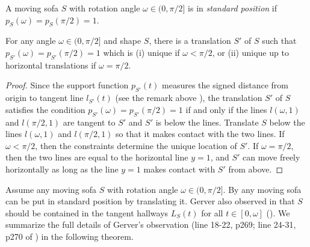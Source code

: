 \begin{definition}

A moving sofa \(S\) with rotation angle \(\omega \in (0, \pi/2]\) is in \emph{standard position} if \(p_S(\omega) = p_S(\pi/2) = 1\).

\label{def:standard-position}
\end{definition}

\begin{proposition}

For any angle \(\omega \in (0, \pi/2]\) and shape \(S\), there is a translation \(S'\) of \(S\) such that \(p_{S'}(\omega) = p_{S'}(\pi/2) = 1\) which is (i) unique if \(\omega < \pi/2\), or (ii) unique up to horizontal translations if \(\omega = \pi/2\).

\label{pro:standard-position-shape}
\end{proposition}

\begin{proof}
Since the support function \(p_{S'}(t)\) measures the signed distance from origin to tangent line \(l_{S'}(t)\) (see the remark above ), the translation \(S'\) of \(S\) satisfies the condition \(p_{S'}(\omega) = p_{S'}(\pi/2) = 1\) if and only if the lines \(l(\omega, 1)\) and \(l(\pi/2, 1)\) are tangent to \(S'\) and \(S'\) is below the lines. Translate \(S\) below the lines \(l(\omega, 1)\) and \(l(\pi/2, 1)\) so that it makes contact with the two lines. If \(\omega < \pi/2\), then the constraints determine the unique location of \(S'\). If \(\omega = \pi/2\), then the two lines are equal to the horizontal line \(y=1\), and \(S'\) can move freely horizontally as long as the line \(y=1\) makes contact with \(S'\) from above.
\end{proof}

Assume any moving sofa \(S\) with rotation angle \(\omega \in (0, \pi/2]\). By  any moving sofa can be put in standard position by translating it. Gerver also observed in \autocite{gerverMovingSofaCorner1992} that \(S\) should be contained in the tangent hallways \(L_S(t)\) for all \(t \in [0, \omega]\) (). We summarize the full details of Gerver’s observation (line 18-22, p269; line 24-31, p270 of \autocite{gerverMovingSofaCorner1992}) in the following theorem.

